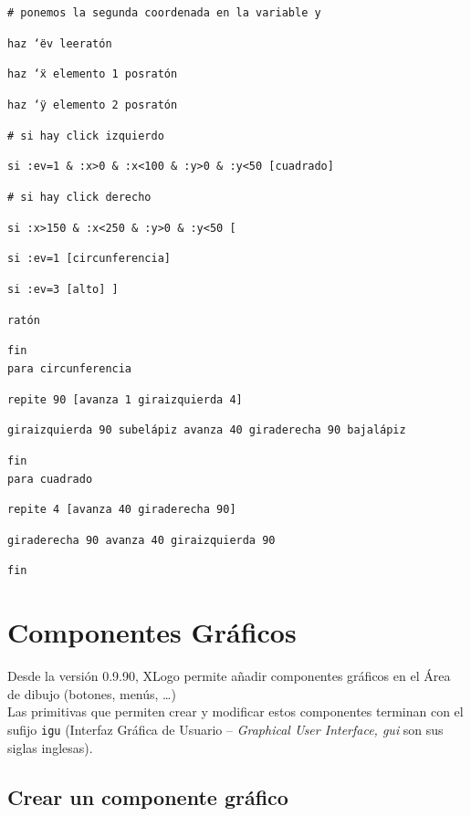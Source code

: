 \noindent \texttt{\# ponemos la segunda coordenada en la variable y}

\texttt{haz \char`\"{}ev leerat\'on}

\texttt{haz \char`\"{}x elemento 1 posrat\'on}

\texttt{haz \char`\"{}y elemento 2 posrat\'on}

\noindent \texttt{\# si hay click izquierdo}

\texttt{si :ev=1 \& :x>0 \& :x<100 \& :y>0 \& :y<50 [cuadrado]}

\noindent \texttt{\# si hay click derecho}

\texttt{si :x>150 \& :x<250 \& :y>0 \& :y<50 [}

\texttt{si :ev=1 [circunferencia]}

\texttt{si :ev=3 [alto] ]}

\texttt{rat\'on}

\noindent \texttt{fin} \\

\noindent \texttt{para circunferencia}

\texttt{repite 90 [avanza 1 giraizquierda 4]}

\texttt{giraizquierda 90 subel\'apiz avanza 40 giraderecha 90 bajal\'apiz}

\noindent \texttt{fin} \\

\noindent \texttt{para cuadrado}

\texttt{repite 4 [avanza 40 giraderecha 90]}

\texttt{giraderecha 90 avanza 40 giraizquierda 90}

\noindent \texttt{fin}

\section{Componentes Gr\'aficos}

Desde la versi\'on 0.9.90, XLogo permite a\~nadir componentes gr\'aficos en el
\'Area de dibujo (botones, men\'us, \ldots) \\

Las primitivas que permiten crear y modificar estos componentes terminan con el
sufijo \texttt{igu} (Interfaz Gr\'afica de Usuario -- \textit{Graphical User
Interface, gui} son sus siglas inglesas).

\subsection{Crear un componente gr\'afico}

